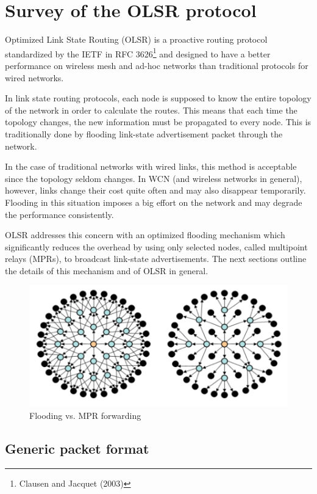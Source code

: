 \documentclass[oneside,openany]{memoir}
\begin{document}
\chapter{Survey of the OLSR protocol}\label{olsr-survey}

Optimized Link State Routing (OLSR) is a proactive routing protocol
standardized by the IETF in RFC 3626\footnote{Clausen and Jacquet (2003)}
and designed to have a better performance on wireless mesh and ad-hoc
networks than traditional protocols for wired networks.

In link state routing protocols, each node is supposed to know the
entire topology of the network in order to calculate the routes. This
means that each time the topology changes, the new information must be
propagated to every node. This is traditionally done by flooding
link-state advertisement packet through the network.

In the case of traditional networks with wired links, this method is
acceptable since the topology seldom changes. In WCN (and wireless
networks in general), however, links change their cost quite often and
may also disappear temporarily. Flooding in this situation imposes a big
effort on the network and may degrade the performance consistently.

OLSR addresses this concern with an optimized flooding mechanism which
significantly reduces the overhead by using only selected nodes, called
multipoint relays (MPRs), to broadcast link-state advertisements. The
next sections outline the details of this mechanism and of OLSR in
general.

\begin{figure}[htbp]
\centering
\includegraphics{images/mpr.png}
\caption{Flooding vs. MPR forwarding}
\end{figure}

\section{Generic packet format}\label{generic-packet-format}
\end{document}
